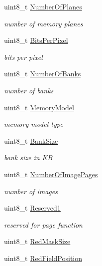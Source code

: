 \begin{DoxyCompactItemize}
uint8\+\_\+t \hyperlink{struct____attribute_____a51268efaac55d78e17263aff9a447998}{Number\+Of\+Planes}
\begin{DoxyCompactList}\small\item\em number of memory planes \end{DoxyCompactList}\item 
uint8\+\_\+t \hyperlink{struct____attribute_____a03756ae144fce823087a2a4255bf4bb1}{Bits\+Per\+Pixel}
\begin{DoxyCompactList}\small\item\em bits per pixel \end{DoxyCompactList}\item 
uint8\+\_\+t \hyperlink{struct____attribute_____aa955c03441b6d3e55b2ba4be4dae56a2}{Number\+Of\+Banks}
\begin{DoxyCompactList}\small\item\em number of banks \end{DoxyCompactList}\item 
uint8\+\_\+t \hyperlink{struct____attribute_____ab9be703b2b515ba3428ed97af9bb084d}{Memory\+Model}
\begin{DoxyCompactList}\small\item\em memory model type \end{DoxyCompactList}\item 
uint8\+\_\+t \hyperlink{struct____attribute_____a7e31ea09e6e6755e3a504b9c76b3f545}{Bank\+Size}
\begin{DoxyCompactList}\small\item\em bank size in KB \end{DoxyCompactList}\item 
uint8\+\_\+t \hyperlink{struct____attribute_____a7033bb4cac6dc49f68ca4df855151e09}{Number\+Of\+Image\+Pages}
\begin{DoxyCompactList}\small\item\em number of images \end{DoxyCompactList}\item 
uint8\+\_\+t \hyperlink{struct____attribute_____a604037992fe7e5fd08e1bcc684a1b12d}{Reserved1}
\begin{DoxyCompactList}\small\item\em reserved for page function \end{DoxyCompactList}\item 
uint8\+\_\+t \hyperlink{struct____attribute_____a5e25f6a8eedde631fff577bcf7d4f6f4}{Red\+Mask\+Size}
\item 
uint8\+\_\+t \hyperlink{struct____attribute_____a20cb142b8c1b0a2b41244fef469a11f4}{Red\+Field\+Position}

\end{DoxyCompactItemize}
